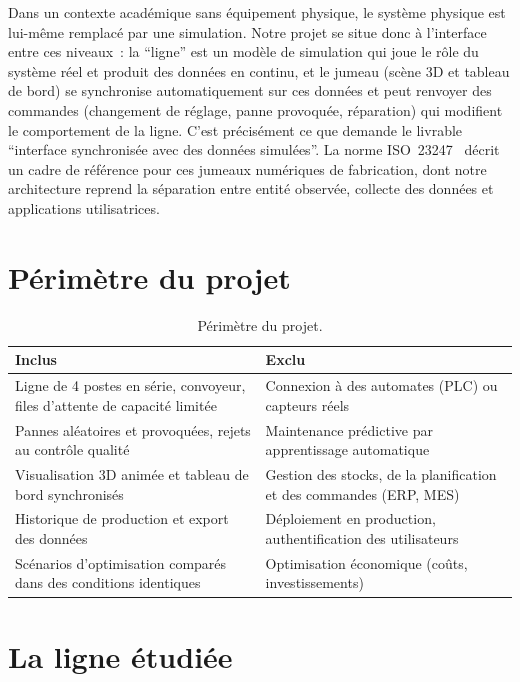 Dans un contexte académique sans équipement physique, le système physique est lui-même remplacé par une simulation. Notre projet se situe donc à l'interface entre ces niveaux~: la \enquote{ligne} est un modèle de simulation qui joue le rôle du système réel et produit des données en continu, et le jumeau (scène \ac{3D} et tableau de bord) se synchronise automatiquement sur ces données et peut renvoyer des commandes (changement de réglage, panne provoquée, réparation) qui modifient le comportement de la ligne. C'est précisément ce que demande le livrable \enquote{interface synchronisée avec des données simulées}. La norme ISO~23247~\cite{iso23247} décrit un cadre de référence pour ces jumeaux numériques de fabrication, dont notre architecture reprend la séparation entre entité observée, collecte des données et applications utilisatrices.

\section{Périmètre du projet}

\begin{table}[H]
\centering
\caption{Périmètre du projet.}
\label{tab:perimetre}
\begin{tabularx}{\textwidth}{@{}X X@{}}
\toprule
\textbf{Inclus} & \textbf{Exclu} \\
\midrule
Ligne de 4 postes en série, convoyeur, files d'attente de capacité limitée & Connexion à des automates (\ac{PLC}) ou capteurs réels \\
Pannes aléatoires et provoquées, rejets au contrôle qualité & Maintenance prédictive par apprentissage automatique \\
Visualisation \ac{3D} animée et tableau de bord synchronisés & Gestion des stocks, de la planification et des commandes (\ac{ERP}, \ac{MES}) \\
Historique de production et export des données & Déploiement en production, authentification des utilisateurs \\
Scénarios d'optimisation comparés dans des conditions identiques & Optimisation économique (coûts, investissements) \\
\bottomrule
\end{tabularx}
\end{table}

\section{La ligne étudiée}

